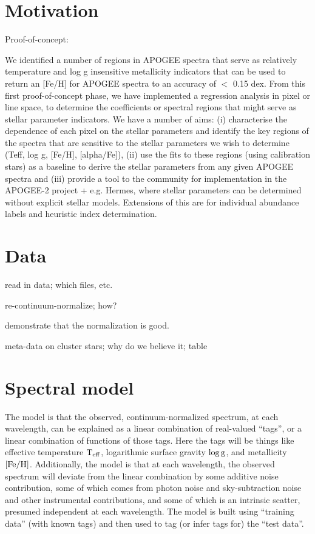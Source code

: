 \documentclass[12pt, preprint]{aastex}
\newcommand{\teff}{\mbox{$\rm T_{eff}$}}
\newcommand{\feh}{\mbox{$\rm [Fe/H]$}}
\newcommand{\logg}{\mbox{$\rm \log g$}}
\begin{document}

\section{Motivation}

Proof-of-concept: 

We identified a number of regions in APOGEE spectra that serve as relatively temperature and log g insensitive metallicity indicators that can be used to return an [Fe/H] for APOGEE spectra to an accuracy of $<$ 0.15 dex. From this first proof-of-concept phase, we have implemented a regression analysis in pixel or line space, to determine the coefficients or spectral regions that might serve as stellar parameter indicators.  We have a number of aims: (i) characterise the dependence of each pixel on the stellar parameters and identify the key regions of the spectra that are sensitive to the stellar parameters we wish to determine (Teff, log g, [Fe/H], [alpha/Fe]), (ii) use the fits to these regions (using calibration stars) as a baseline to derive the stellar parameters from any given APOGEE spectra and (iii) provide a tool to the community for implementation in the APOGEE-2 project + e.g. Hermes, where stellar parameters can be determined without explicit stellar models. Extensions of this are for individual abundance labels and heuristic index determination.

\section{Data}

read in data; which files, etc.

re-continuum-normalize; how?

demonstrate that the normalization is good.

meta-data on cluster stars; why do we believe it; table

\section{Spectral model}

The model is that the observed, continuum-normalized spectrum, at each
wavelength, can be explained as a linear combination of real-valued
``tags'', or a linear combination of functions of those tags.
Here the tags will be things like effective temperature $\teff$,
logarithmic surface gravity $\logg$, and metallicity $\feh$.
Additionally, the model is that at each wavelength, the observed
spectrum will deviate from the linear combination by some additive
noise contribution, some of which comes from photon noise and
sky-subtraction noise and other instrumental contributions, and some
of which is an intrinsic scatter, presumed independent at each
wavelength.
The model is built using ``training data'' (with known tags) and then
used to tag (or infer tags for) the ``test data''.
\end{document}
